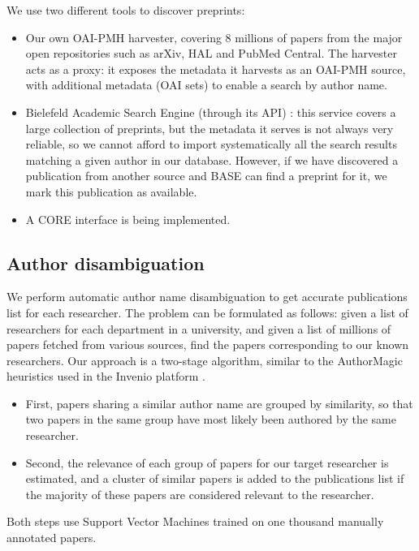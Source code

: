 \documentclass[a4paper]{article}
\begin{document}
We use two different tools to discover preprints:

\begin{itemize}
\item
  Our own OAI-PMH \cite{oaipmh} harvester, covering 8 millions of papers from the
  major open repositories such as arXiv, HAL and PubMed Central. The
  harvester acts as a proxy: it exposes the metadata it harvests as an
  OAI-PMH source, with additional metadata (OAI sets) to enable a search
  by author name. 
\item
  Bielefeld Academic Search Engine (through its API) \cite{lossau2006bielefeld}:
  this service covers a large collection of preprints, but the metadata it
  serves is not always very reliable, so we cannot afford to import
  systematically all the search results matching a given author in our
  database. However, if we have discovered a publication from another
  source and BASE can find a preprint for it, we mark this publication
  as available.
\item
  A CORE \cite{knoth2011core} interface is being implemented.
\end{itemize}

\subsection{Author disambiguation}

We perform automatic author name disambiguation to get accurate
publications list for each researcher. The problem can be formulated as
follows: given a list of researchers for each department in a
university, and given a list of millions of papers fetched from various
sources, find the papers corresponding to our known researchers. Our
approach is a two-stage algorithm, similar to the AuthorMagic heuristics
used in the Invenio platform \cite{weiler2011authormagic}.

\begin{itemize}
\item
  First, papers sharing a similar author name are grouped by similarity,
  so that two papers in the same group have most likely been authored by
  the same researcher.
\item
  Second, the relevance of each group of papers for our target
  researcher is estimated, and a cluster of similar papers is added to
  the publications list if the majority of these papers are considered
  relevant to the researcher.
\end{itemize}

Both steps use Support Vector Machines trained on one thousand manually
annotated papers.



\end{document}
